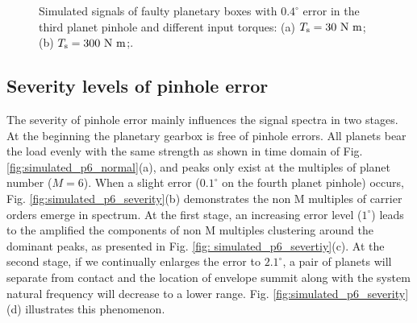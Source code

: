 \documentclass[a4paper,fleqn]{cas-sc}%
\begin{document}
\begin{figure}[pos=htbp]
    \caption{Simulated signals of faulty planetary boxes with $0.4^\circ$ error in the third planet pinhole and different input torques: (a) $T_{\rm s}=30\ {\rm N\ m}$; (b) $T_{\rm s}=300\ {\rm N\ m}$;.}
    \label{fig:simulated_p5_fault}
\end{figure}
\subsection{Severity levels of pinhole error}
\par The severity of pinhole error mainly influences the signal spectra in two stages. At the beginning the planetary gearbox is free of pinhole errors. All planets bear the load evenly with the same strength as shown in time domain of Fig. \ref{fig:simulated_p6_normal}(a), and peaks only exist at the multiples of planet number ($M=6$). When a slight error ($0.1^\circ$ on the fourth planet pinhole) occurs, Fig. \ref{fig:simulated_p6_severity}(b) demonstrates the non M multiples of carrier orders emerge in spectrum.  At the first stage, an increasing error level ($1^\circ$) leads to the amplified the components of non M multiples clustering around the dominant peaks, as presented in Fig. \ref{fig: simulated_p6_severtiy}(c). At the second stage, if we continually enlarges the error to $2.1^\circ$, a pair of planets will separate from contact and the location of envelope summit along with the system natural frequency will decrease to a lower range. Fig. \ref{fig:simulated_p6_severity}(d) illustrates this phenomenon.
\end{document}
